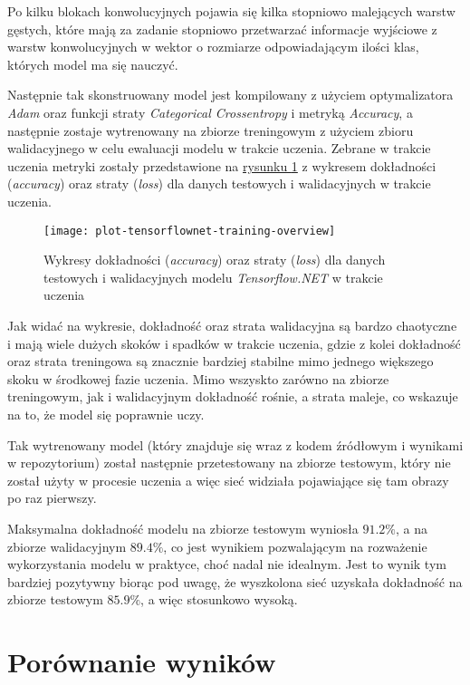 Po kilku blokach konwolucyjnych pojawia się kilka stopniowo malejących warstw gęstych, które mają za zadanie stopniowo przetwarzać informacje wyjściowe z warstw konwolucyjnych w wektor o rozmiarze odpowiadającym ilości klas, których model ma się nauczyć.

Następnie tak skonstruowany model jest kompilowany z użyciem optymalizatora \emph{Adam} oraz funkcji straty \emph{Categorical Crossentropy} i metryką \emph{Accuracy}, a następnie zostaje wytrenowany na zbiorze treningowym z użyciem zbioru walidacyjnego w celu ewaluacji modelu w trakcie uczenia.
Zebrane w trakcie uczenia metryki zostały przedstawione na \hyperref[fig:plot-tensorflownet-training-overview]{rysunku \ref*{fig:plot-tensorflownet-training-overview}} z wykresem dokładności (\emph{accuracy}) oraz straty (\emph{loss}) dla danych testowych i walidacyjnych w trakcie uczenia.

\begin{figure}[ht]
  \texttt{[image: plot-tensorflownet-training-overview]}
  \caption[Wykresy statystyk modelu Tensorflow.NET w trakcie uczenia]{Wykresy dokładności (\emph{accuracy}) oraz straty (\emph{loss}) dla danych testowych i walidacyjnych modelu \emph{Tensorflow.NET} w trakcie uczenia}
  \label{fig:plot-tensorflownet-training-overview}
\end{figure}

Jak widać na wykresie, dokładność oraz strata walidacyjna są bardzo chaotyczne i mają wiele dużych skoków i spadków w trakcie uczenia, gdzie z kolei dokładność oraz strata treningowa są znacznie bardziej stabilne mimo jednego większego skoku w środkowej fazie uczenia.
Mimo wszyskto zarówno na zbiorze treningowym, jak i walidacyjnym dokładność rośnie, a strata maleje, co wskazuje na to, że model się poprawnie uczy.

Tak wytrenowany model (który znajduje się wraz z kodem źródłowym i wynikami w repozytorium) został następnie przetestowany na zbiorze testowym, który nie został użyty w procesie uczenia a więc sieć widziała pojawiające się tam obrazy po raz pierwszy.

Maksymalna dokładność modelu na zbiorze testowym wyniosła $91.2\%$, a na zbiorze walidacyjnym $89.4\%$, co jest wynikiem pozwalającym na rozważenie wykorzystania modelu w praktyce, choć nadal nie idealnym.
Jest to wynik tym bardziej pozytywny biorąc pod uwagę, że wyszkolona sieć uzyskała dokładność na zbiorze testowym $85.9\%$, a więc stosunkowo wysoką.

\section{Porównanie wyników}

